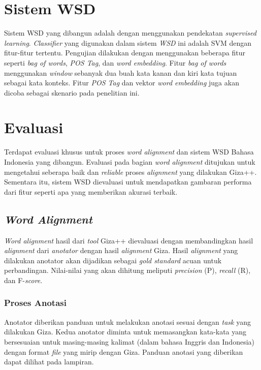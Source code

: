 \section{Sistem WSD} \label{sec:Sistem WSD}
Sistem WSD yang dibangun adalah dengan menggunakan pendekatan \textit{supervised learning}. \textit{Classifier} yang digunakan dalam sistem \textit{WSD} ini adalah SVM dengan fitur-fitur tertentu. Pengujian dilakukan dengan menggunakan beberapa fitur seperti \textit{bag of words}, \textit{POS Tag}, dan \textit{word embedding}. Fitur \textit{bag of words} menggunakan \textit{window} sebanyak dua buah kata kanan dan kiri kata tujuan sebagai kata konteks. Fitur \textit{POS Tag} dan vektor \textit{word embedding} juga akan dicoba sebagai skenario pada penelitian ini.

\section{Evaluasi}

Terdapat evaluasi khusus untuk proses \textit{word alignment} dan sistem WSD Bahasa Indonesia yang dibangun. Evaluasi pada bagian \textit{word alignment} ditujukan untuk mengetahui seberapa baik dan \textit{reliable} proses \textit{alignment} yang dilakukan Giza++. Sementara itu, sistem WSD dievaluasi untuk mendapatkan gambaran performa dari fitur seperti apa yang memberikan akurasi terbaik.

\subsection{\textit{Word Alignment}}
\textit{Word alignment} hasil dari \textit{tool} Giza++ dievaluasi dengan membandingkan hasil \textit{alignment} dari \textit{anotator} dengan hasil \textit{alignment} Giza. Hasil \textit{alignment} yang dilakukan anotator akan dijadikan sebagai \textit{gold standard} acuan untuk perbandingan. Nilai-nilai yang akan dihitung meliputi \textit{precision} (P), \textit{recall} (R), dan F-\textit{score}. 

\subsubsection{Proses Anotasi}

Anotator diberikan panduan untuk melakukan anotasi sesuai dengan \textit{task} yang dilakukan Giza. Kedua anotator diminta untuk memasangkan kata-kata yang bersesuaian untuk masing-masing kalimat (dalam bahasa Inggris dan Indonesia) dengan format \textit{file} yang mirip dengan Giza. Panduan anotasi yang diberikan dapat dilihat pada lampiran.

